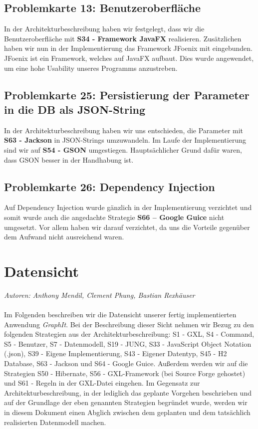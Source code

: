\documentclass[enabledeprecatedfontcommands,fontsize=11pt,paper=a4,twoside]{scrartcl}
\begin{document}
\subsection{Problemkarte 13: Benutzeroberfläche}
In der Architekturbeschreibung haben wir festgelegt, dass wir die Benutzeroberfläche mit \textbf{S34 - Framework JavaFX} realisieren. Zusätzlichen haben wir nun in der Implementierung das Framework JFoenix mit eingebunden. JFoenix ist ein Framework, welches auf JavaFX aufbaut. Dies wurde angewendet, um eine hohe Usability unseres Programms anzustreben.\\


\subsection{Problemkarte 25: Persistierung der Parameter in die DB als JSON-String}
In der Architekturbeschreibung haben wir uns entschieden, die Parameter mit \textbf{S63 - Jackson} in JSON-Strings umzuwandeln. Im Laufe der Implementierung sind wir auf \textbf{S54 - GSON} umgestiegen. Hauptsächlicher Grund dafür waren, dass GSON besser in der Handhabung ist. \\


\subsection{Problemkarte 26: Dependency Injection}
Auf Dependency Injection wurde gänzlich in der Implementierung verzichtet und somit wurde auch die angedachte Strategie \textbf{S66 – Google Guice} nicht umgesetzt. Vor allem haben wir darauf verzichtet, da uns die Vorteile gegenüber dem Aufwand nicht ausreichend waren. \\


\newpage
\section{Datensicht}
\label{sec:datensicht}

\emph{Autoren: Anthony Mendil, Clement Phung, Bastian Rexhäuser}\\ \\

Im Folgenden beschreiben wir die Datensicht unserer fertig implementierten Anwendung \textit{GraphIt}. Bei der Beschreibung dieser Sicht nehmen wir Bezug zu den folgenden Strategien aus der Architekturbeschreibung: S1 - GXL, S4 - Command, S5 - Benutzer, S7 - Datenmodell, S19 - JUNG, S33 - JavaScript Object Notation (.json), S39 - Eigene Implementierung, S43 - Eigener Datentyp, S45 - H2 Database, S63 - Jackson und S64 - Google Guice. Außerdem werden wir auf die Strategien S50 - Hibernate, S56 - GXL-Framework (bei Source Forge gehostet) und S61 - Regeln in der GXL-Datei eingehen. Im Gegensatz zur Architekturbeschreibung, in der lediglich das geplante Vorgehen beschrieben und auf der Grundlage der eben genannten Strategien begründet wurde, werden wir in diesem Dokument einen Abglich zwischen dem geplanten und dem tatsächlich realisierten Datenmodell machen. \\
\end{document}
